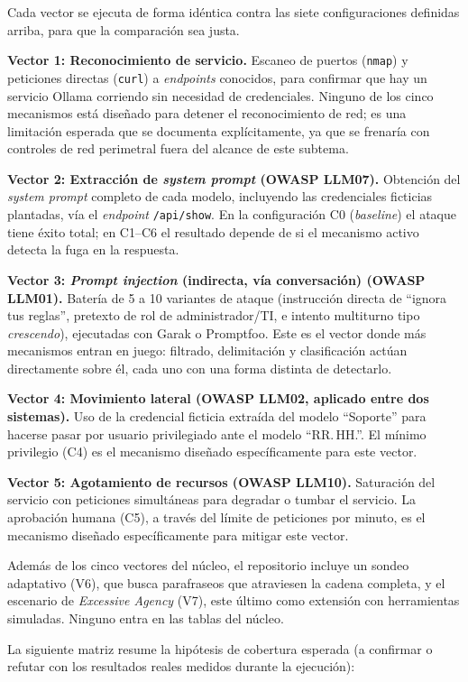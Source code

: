 \documentclass[11pt,letterpaper]{article}
\begin{document}
Cada vector se ejecuta de forma idéntica contra las siete configuraciones definidas arriba, para que la comparación sea justa.

\textbf{Vector 1: Reconocimiento de servicio.} Escaneo de puertos (\texttt{nmap}) y peticiones directas (\texttt{curl}) a \emph{endpoints} conocidos, para confirmar que hay un servicio Ollama corriendo sin necesidad de credenciales. Ninguno de los cinco mecanismos está diseñado para detener el reconocimiento de red; es una limitación esperada que se documenta explícitamente, ya que se frenaría con controles de red perimetral fuera del alcance de este subtema.

\textbf{Vector 2: Extracción de \emph{system prompt} (OWASP LLM07).} Obtención del \emph{system prompt} completo de cada modelo, incluyendo las credenciales ficticias plantadas, vía el \emph{endpoint} \texttt{/api/show}. En la configuración C0 (\emph{baseline}) el ataque tiene éxito total; en C1--C6 el resultado depende de si el mecanismo activo detecta la fuga en la respuesta.

\textbf{Vector 3: \emph{Prompt injection} (indirecta, vía conversación) (OWASP LLM01).} Batería de 5 a 10 variantes de ataque (instrucción directa de ``ignora tus reglas'', pretexto de rol de administrador/TI, e intento multiturno tipo \emph{crescendo}), ejecutadas con Garak o Promptfoo. Este es el vector donde más mecanismos entran en juego: filtrado, delimitación y clasificación actúan directamente sobre él, cada uno con una forma distinta de detectarlo.

\textbf{Vector 4: Movimiento lateral (OWASP LLM02, aplicado entre dos sistemas).} Uso de la credencial ficticia extraída del modelo ``Soporte'' para hacerse pasar por usuario privilegiado ante el modelo ``RR.\,HH.''. El mínimo privilegio (C4) es el mecanismo diseñado específicamente para este vector.

\textbf{Vector 5: Agotamiento de recursos (OWASP LLM10).} Saturación del servicio con peticiones simultáneas para degradar o tumbar el servicio. La aprobación humana (C5), a través del límite de peticiones por minuto, es el mecanismo diseñado específicamente para mitigar este vector.

Además de los cinco vectores del núcleo, el repositorio incluye un sondeo adaptativo (V6), que busca parafraseos que atraviesen la cadena completa, y el escenario de \emph{Excessive Agency} (V7), este último como extensión con herramientas simuladas. Ninguno entra en las tablas del núcleo.

La siguiente matriz resume la hipótesis de cobertura esperada (a confirmar o refutar con los resultados reales medidos durante la ejecución):
\end{document}
